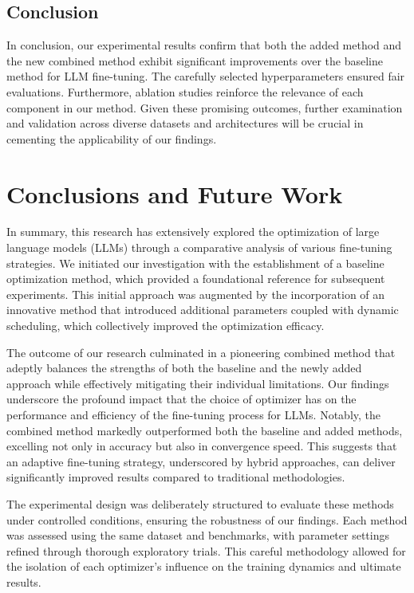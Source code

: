 \documentclass{article} %
\begin{document}
\subsection{Conclusion}

In conclusion, our experimental results confirm that both the added method and the new combined method exhibit significant improvements over the baseline method for LLM fine-tuning. The carefully selected hyperparameters ensured fair evaluations. Furthermore, ablation studies reinforce the relevance of each component in our method. Given these promising outcomes, further examination and validation across diverse datasets and architectures will be crucial in cementing the applicability of our findings.

\section{Conclusions and Future Work}
\label{sec:conclusion}
In summary, this research has extensively explored the optimization of large language models (LLMs) through a comparative analysis of various fine-tuning strategies. We initiated our investigation with the establishment of a baseline optimization method, which provided a foundational reference for subsequent experiments. This initial approach was augmented by the incorporation of an innovative method that introduced additional parameters coupled with dynamic scheduling, which collectively improved the optimization efficacy.

The outcome of our research culminated in a pioneering combined method that adeptly balances the strengths of both the baseline and the newly added approach while effectively mitigating their individual limitations. Our findings underscore the profound impact that the choice of optimizer has on the performance and efficiency of the fine-tuning process for LLMs. Notably, the combined method markedly outperformed both the baseline and added methods, excelling not only in accuracy but also in convergence speed. This suggests that an adaptive fine-tuning strategy, underscored by hybrid approaches, can deliver significantly improved results compared to traditional methodologies.

The experimental design was deliberately structured to evaluate these methods under controlled conditions, ensuring the robustness of our findings. Each method was assessed using the same dataset and benchmarks, with parameter settings refined through thorough exploratory trials. This careful methodology allowed for the isolation of each optimizer's influence on the training dynamics and ultimate results.
\end{document}
